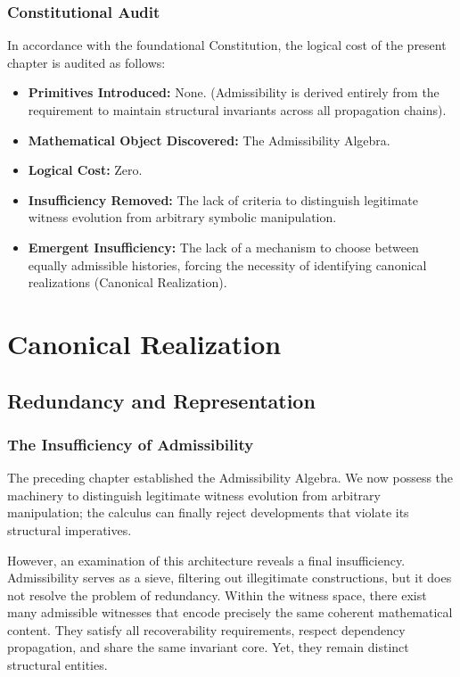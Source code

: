 \documentclass[12pt,anyside]{book}
\begin{document}
\subsection{Constitutional Audit}
In accordance with the foundational Constitution, the logical cost of the present chapter is audited as follows:
\begin{itemize}
    \item \textbf{Primitives Introduced:} None. (Admissibility is derived entirely from the requirement to maintain structural invariants across all propagation chains).
    \item \textbf{Mathematical Object Discovered:} The Admissibility Algebra.
    \item \textbf{Logical Cost:} Zero.
    \item \textbf{Insufficiency Removed:} The lack of criteria to distinguish legitimate witness evolution from arbitrary symbolic manipulation.
    \item \textbf{Emergent Insufficiency:} The lack of a mechanism to choose between equally admissible histories, forcing the necessity of identifying canonical realizations (Canonical Realization).
\end{itemize}


\chapter{Canonical Realization}
\setlength{\parindent}{0pt}

\section{Redundancy and Representation}

\subsection{The Insufficiency of Admissibility}
The preceding chapter established the Admissibility Algebra. We now possess the machinery to distinguish legitimate witness evolution from arbitrary manipulation; the calculus can finally reject developments that violate its structural imperatives.

However, an examination of this architecture reveals a final insufficiency. Admissibility serves as a sieve, filtering out illegitimate constructions, but it does not resolve the problem of redundancy. Within the witness space, there exist many admissible witnesses that encode precisely the same coherent mathematical content. They satisfy all recoverability requirements, respect dependency propagation, and share the same invariant core. Yet, they remain distinct structural entities.
\end{document}

